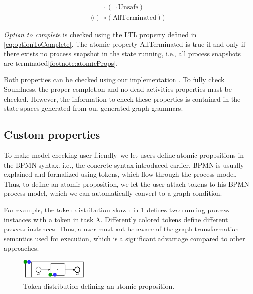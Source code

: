 \documentclass[adraft, copyright, creativecommons]{eptcs} %
\begin{document}
\begin{align}
    & \square (\neg \,\text{Unsafe}) \label{eq:safeness} \\
    \lozenge (& \square(\text{AllTerminated})) \label{eq:optionToComplete}
\end{align}

\emph{Option to complete} is checked using the LTL property defined in \eqref{eq:optionToComplete}.
The atomic property \textsf{AllTerminated} is true if and only if there exists no process snapshot in the state running, i.e., all process snapshots are terminated\cref{footnote:atomicProps}.

Both properties can be checked using our implementation \cite{timkrauterArtifactsTERMGRAPH2022}.
To fully check Soundness, the proper completion and no dead activities properties must be checked.
However, the information to check these properties is contained in the state spaces generated from our generated graph grammars.

\subsection{Custom properties} \label{subsec:customProperties}
To make model checking user-friendly, we let users define atomic propositions in the BPMN syntax, i.e., the concrete syntax introduced earlier.
BPMN is usually explained and formalized using tokens, which flow through the process model.
Thus, to define an atomic proposition, we let the user attach tokens to his BPMN process model, which we can automatically convert to a graph condition.

For example, the token distribution shown in \cref{fig:atomicProposition} defines two running process instances with a token in task A.
Differently colored tokens define different process instances.
Thus, a user must not be aware of the graph transformation semantics used for execution, which is a significant advantage compared to other approaches.

\begin{figure}[h]
    \centering
    \includegraphics[width=0.3\textwidth]{images/bpmn_semantics-atomicProp.pdf}
    \caption{Token distribution defining an atomic proposition.}
    \label{fig:atomicProposition}
\end{figure}
\end{document}
